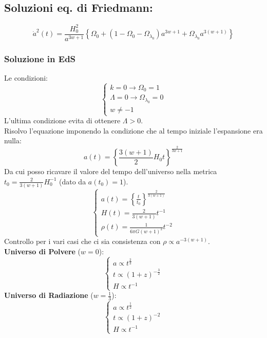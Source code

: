 \documentclass[12pt, a4paper]{article}
\begin{document}
\subsection{Soluzioni eq. di Friedmann:}
\begin{equation}
    \dot{a}^2(t)=\frac{H_0^2}{a^{3w+1}}\left\{\Omega_0+(1-\Omega_0-\Omega_{\lambda_0})a^{3w+1}+\Omega_{\lambda_0}a^{3(w+1)}\right\}
\end{equation}
\subsubsection{Soluzione in EdS}
Le condizioni:
\begin{equation}
    \begin{cases}
         k=0 \rightarrow \Omega_0=1
         \\
         \Lambda=0 \rightarrow \Omega_{\lambda_0}=0
         \\
         w \neq -1
    \end{cases}
\end{equation}
L'ultima condizione evita di ottenere $\Lambda > 0$.\\
Risolvo l'equazione imponendo la condizione che al tempo iniziale l'espansione era nulla:
\begin{equation}
    a(t)= \left\{\frac{3(w+1)}{2}H_0 t\right\}^{\frac{2}{3w+1}}
\end{equation}
Da cui posso ricavare il valore del tempo dell'universo nella metrica $t_0= \frac{2}{3(w+1)}H_0^{-1}$ (dato da $a(t_0)=1$). 
\begin{equation}
    \begin{cases}
         a(t)= \left\{\frac{t}{t_0}\right\}^{\frac{2}{3(w+1)}}
         \\
         H(t)=\frac{2}{3(w+1)}t^{-1}
         \\
         \rho(t)= \frac{1}{6 \pi G (w+1)^2}t^{-2}
    \end{cases}
\end{equation}
Controllo per i vari casi che ci sia consistenza con $\rho \propto a^{-3(w+1)}$.\\
\textbf{Universo di Polvere} ($w=0$):
 \begin{equation}
     \begin{cases}
         a\propto t^{\frac{2}{3}}
         \\
         t \propto (1+z)^{-\frac{3}{2}}
         \\
         H\propto t^{-1}
     \end{cases}
 \end{equation}
\textbf{Universo di Radiazione} ($w=\frac{1}{3}$):
 \begin{equation}
     \begin{cases}
         a\propto t^{\frac{1}{2}}
         \\
         t \propto (1+z)^{-2}
         \\
         H\propto t^{-1}
     \end{cases}
 \end{equation}
\end{document}
